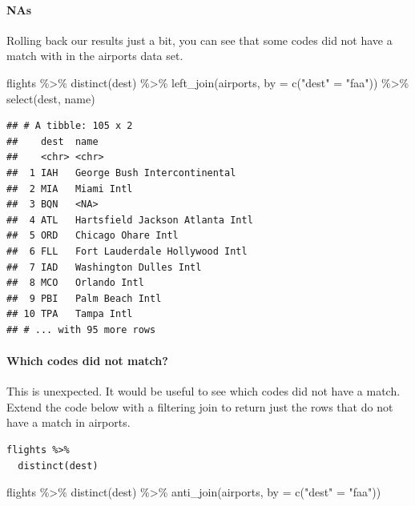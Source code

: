 \documentclass[
]{article}
\newenvironment{Shaded}{\begin{snugshade}}{\end{snugshade}}
\newcommand{\AttributeTok}[1]{\textcolor[rgb]{0.77,0.63,0.00}{#1}}
\newcommand{\FunctionTok}[1]{\textcolor[rgb]{0.00,0.00,0.00}{#1}}
\newcommand{\NormalTok}[1]{#1}
\newcommand{\OtherTok}[1]{\textcolor[rgb]{0.56,0.35,0.01}{#1}}
\newcommand{\SpecialCharTok}[1]{\textcolor[rgb]{0.00,0.00,0.00}{#1}}
\newcommand{\StringTok}[1]{\textcolor[rgb]{0.31,0.60,0.02}{#1}}
\begin{document}
\hypertarget{nas}{%
\paragraph{NAs}\label{nas}}

Rolling back our results just a bit, you can see that some codes did not
have a match with in the airports data set.

\begin{Shaded}
\begin{Highlighting}[]
\NormalTok{flights }\SpecialCharTok{\%\textgreater{}\%} 
  \FunctionTok{distinct}\NormalTok{(dest) }\SpecialCharTok{\%\textgreater{}\%} 
  \FunctionTok{left\_join}\NormalTok{(airports, }\AttributeTok{by =} \FunctionTok{c}\NormalTok{(}\StringTok{"dest"} \OtherTok{=} \StringTok{"faa"}\NormalTok{)) }\SpecialCharTok{\%\textgreater{}\%} 
  \FunctionTok{select}\NormalTok{(dest, name)}
\end{Highlighting}
\end{Shaded}

\begin{verbatim}
## # A tibble: 105 x 2
##    dest  name                           
##    <chr> <chr>                          
##  1 IAH   George Bush Intercontinental   
##  2 MIA   Miami Intl                     
##  3 BQN   <NA>                           
##  4 ATL   Hartsfield Jackson Atlanta Intl
##  5 ORD   Chicago Ohare Intl             
##  6 FLL   Fort Lauderdale Hollywood Intl 
##  7 IAD   Washington Dulles Intl         
##  8 MCO   Orlando Intl                   
##  9 PBI   Palm Beach Intl                
## 10 TPA   Tampa Intl                     
## # ... with 95 more rows
\end{verbatim}

\hypertarget{which-codes-did-not-match}{%
\paragraph{Which codes did not match?}\label{which-codes-did-not-match}}

This is unexpected. It would be useful to see which codes did not have a
match. Extend the code below with a filtering join to return just the
rows that do not have a match in airports.

\begin{verbatim}
flights %>%
  distinct(dest)
\end{verbatim}

\begin{Shaded}
\begin{Highlighting}[]
\NormalTok{flights }\SpecialCharTok{\%\textgreater{}\%}
  \FunctionTok{distinct}\NormalTok{(dest) }\SpecialCharTok{\%\textgreater{}\%}
  \FunctionTok{anti\_join}\NormalTok{(airports, }\AttributeTok{by =} \FunctionTok{c}\NormalTok{(}\StringTok{"dest"} \OtherTok{=} \StringTok{"faa"}\NormalTok{))}
\end{Highlighting}
\end{Shaded}
\end{document}
